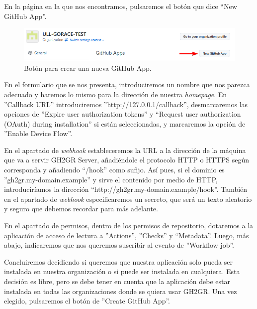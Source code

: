 En la página en la que nos encontramos, pulsaremos el botón que dice ``New GitHub App''.

\begin{figure}[H]
    \centering
    \includegraphics[width=0.5\linewidth]{images/new-app-btn.png}
    \caption{Botón para crear una nueva GitHub App.}
\end{figure}

En el formulario que se nos presenta, introduciremos un nombre que nos parezca adecuado y haremos lo mismo para la dirección de nuestra \textit{homepage}. En ''Callback URL'' introduciremos ''http://127.0.0.1/callback'', desmarcaremos las opciones de ''Expire user authorization tokens'' y ``Request user authorization (OAuth) during installation'' si están seleccionadas, y marcaremos la opción de ''Enable Device Flow''.

En el apartado de \textit{webhook} estableceremos la URL a la dirección de la máquina que va a servir GH2GR Server, añadiéndole el protocolo \acrshort{HTTP} o \acrshort{HTTPS} según corresponda y añadiendo ``/hook'' como sufijo. Así pues, si el dominio es ''gh2gr.my-domain.example'' y sirve el contenido por medio de \acrshort{HTTP}, introduciríamos la dirección ``http://gh2gr.my-domain.example/hook''. También en el apartado de \textit{webhook} especificaremos un secreto, que será un texto aleatorio y seguro que debemos recordar para más adelante.

En el apartado de permisos, dentro de los permisos de repositorio, dotaremos a la aplicación de acceso de lectura a ''Actions'', ''Checks'' y ``Metadata''. Luego, más abajo, indicaremos que nos queremos suscribir al evento de ''Workflow job''.

Concluiremos decidiendo si queremos que nuestra aplicación solo pueda ser instalada en nuestra organización o si puede ser instalada en cualquiera. Esta decisión es libre, pero se debe tener en cuenta que la aplicación debe estar instalada en todas las organizaciones donde se quiera usar GH2GR. Una vez elegido, pulsaremos el botón de ''Create GitHub App''.

